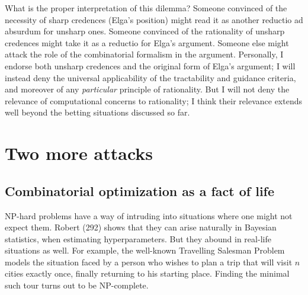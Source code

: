 \documentclass[letterpaper,12pt]{article}
\begin{document}
What is the proper interpretation of this dilemma? Someone convinced of the necessity of sharp credences (Elga's position) might read it as another reductio ad absurdum for unsharp ones. Someone convinced of the rationality of unsharp credences might take it as a reductio for Elga's argument. Someone else might attack the role of the combinatorial formalism in the argument. Personally, I endorse both unsharp credences and the original form of Elga's argument; I will instead deny the universal applicability of the tractability and guidance criteria, and moreover of any \emph{particular} principle of rationality. But I will not deny the relevance of computational concerns to rationality; I think their relevance extends well beyond the betting situations discussed so far.




\section{Two more attacks}
\subsection{Combinatorial optimization as a fact of life}
NP-hard problems have a way of intruding into situations where one might not expect them. Robert (292) shows that they can arise naturally in Bayesian statistics, when estimating hyperparameters. But they abound in real-life situations as well. For example, the well-known Travelling Salesman Problem models the situation faced by a person who wishes to plan a trip that will visit $n$ cities exactly once, finally returning to his starting place. Finding the minimal such tour turns out to be NP-complete.
\end{document}

